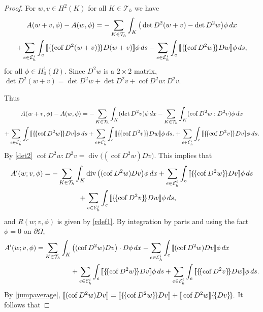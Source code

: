\documentclass[12pt]{amsart}
\def \[{ \mbox{[ \hspace{-.5em}[}} %
\def \]{ \mbox{] \hspace{-.5em}]}}
\numberwithin{equation}{section}
\newcommand{\ud}{\,d}
\newcommand\cof{\operatorname{cof}}
\renewcommand{\div}{\operatorname{div}}
\begin{document}
\begin{proof}
For $w,v \in H^2(K)$ for all $K \in \mathcal{T}_h$ we have
\begin{multline*}
A(w+v,\phi)-A(w,\phi)= -\sum_{K \in \mathcal{T}_h}  \int_{K} \big(\det D^2(w+v)-\det D^2w\big)\phi\ud x \\+ 
\sum_{e \in \mathcal{E}_h^i } \int_e \[\{\!\{\cof D^2 (w+v) \}\!\} D (w+v) \] \phi \ud s - \sum_{e \in \mathcal{E}_h^i } \int_e \[\{\!\{\cof D^2 w \}\!\} D w \] \phi
\ud s,
\end{multline*}
for all $\phi \in H^1_0(\Omega)$.
Since $D^2 w$ is a $2 \times 2$ matrix, $\det D^2(w+v)= \det D^2 w + \det D^2 v +\cof D^2 w : D^2 v$. 

Thus 
\begin{multline*}
A(w+v,\phi)-A(w,\phi)= -\sum_{K \in \mathcal{T}_h}  \int_{K} (\det D^2v)\phi\ud x  -\sum_{K \in \mathcal{T}_h}  \int_{K} (\cof D^2 w: D^2v)\phi\ud x \\+ \sum_{e \in \mathcal{E}_h^i } \int_e \[\{\!\{\cof D^2 w \}\!\} D v \] \phi\ud s + \sum_{e \in \mathcal{E}_h^i } \int_e \[\{\!\{\cof D^2 v \}\!\} D w \] \phi\ud s.
+ \sum_{e \in \mathcal{E}_h^i } \int_e \[\{\!\{\cof D^2 v \}\!\} D v \] \phi\ud s.
\end{multline*}
By \eqref{det2} $\cof  D^2 w: D^2 v = \div\big((\cof D^2 w) D v )$.
This implies that
\begin{align*} %
A'(w;v,\phi) & = -\sum_{K \in \mathcal{T}_h} \int_{K} \div \big((\cof  D^2 w) D v\big) \phi \ud x +
\sum_{e \in \mathcal{E}_h^i } \int_e \[\{\!\{\cof D^2 w \}\!\} D v \] \phi 
\ud s \\ & \qquad \qquad \quad + \sum_{e \in \mathcal{E}_h^i } \int_e \[\{\!\{\cof D^2 v \}\!\} D w \] \phi
\ud s,
\end{align*}
and $R(w;v,\phi)$ is given by \eqref{rdef1}.
By integration by parts and using the fact $\phi=0$ on $\partial \Omega$,
\begin{align*}
A'(w;v,\phi) 
& = \sum_{K \in \mathcal{T}_h} \int_{K} \big((\cof  D^2 w)  D v \big) \cdot D \phi \ud x - \sum_{e \in \mathcal{E}_h^i }
\int_e \[(\cof  D^2 w) D v \] \phi   \ud x \\
& \qquad \qquad \quad  +
\sum_{e \in \mathcal{E}_h^i } \int_e \[\{\!\{\cof D^2 w \}\!\} D v \] \phi 
\ud s  + \sum_{e \in \mathcal{E}_h^i } \int_e \[\{\!\{\cof D^2 v \}\!\} D w \] \phi
\ud s .
\end{align*}
By \eqref{jumpaverage},
$
\[(\cof  D^2 w) D v\] = \[\{\!\{\cof  D^2 w \}\!\} D v \] + \[\cof  D^2 w\] \{\!\{D v\}\!\}.
$
It follows that



\end{proof}
\end{document}
